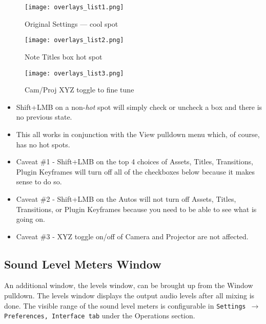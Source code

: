 \begin{figure}[htpb]
	\begin{minipage}{.29\linewidth}
		\centering
		\texttt{[image: overlays\_list1.png]}
		\caption{Original Settings --- cool spot}
		\label{fig:overlays_list1}
	\end{minipage}
	\hfill
	\begin{minipage}{.29\linewidth}
		\centering
		\texttt{[image: overlays\_list2.png]}
		\caption{Note Titles box hot spot  }
		\label{fig:overlays_list2}
	\end{minipage}
	\hfill
	\begin{minipage}{.29\linewidth}
		\centering
		\texttt{[image: overlays\_list3.png]}
		\caption{Cam/Proj XYZ toggle to fine tune}
		\label{fig:overlays_list3}
	\end{minipage}
\end{figure}

\begin{itemize}
    \item  Shift+LMB on a non-\textit{hot} spot will simply check or uncheck a box and there is no previous state.
    \item This all works in conjunction with the View pulldown menu which, of course, has no hot spots.
    \item  Caveat \#1 - Shift+LMB on the top 4 choices of Assets, Titles, Transitions, Plugin Keyframes will turn
        off all of the checkboxes below because it makes sense to do so.
    \item  Caveat \#2 - Shift+LMB on the Autos will not turn off Assets, Titles, Transitions, or Plugin Keyframes
        because you need to be able to see what is going on.
        \item Caveat \#3 - XYZ toggle on/off of Camera and Projector are not affected.
\end{itemize}




\subsection{Sound Level Meters Window}%
\label{sub:sound_level_meters_window}

An additional window, the levels window, can be brought up from the Window pulldown.  
The levels window displays the output audio levels after all mixing is done.  
The visible range of the sound level meters is configurable in \texttt{Settings $\rightarrow$ Preferences, Interface tab} under the Operations section.

